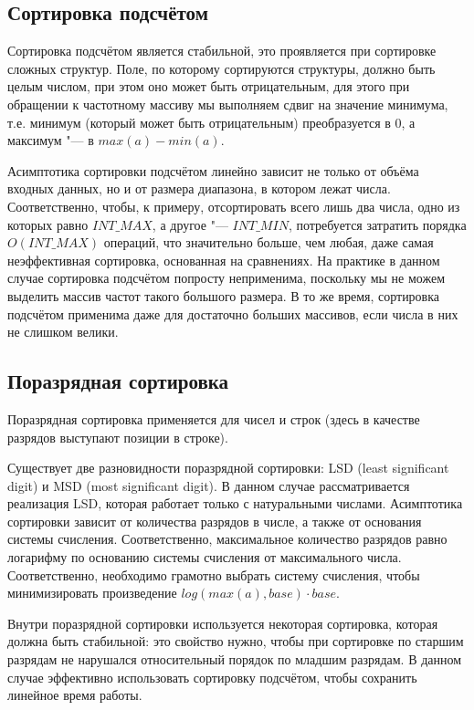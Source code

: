\documentclass[otchet]{../SCWorks}
\begin{document}
\subsection{Сортировка подсчётом}

Сортировка подсчётом является стабильной, это проявляется при сортировке сложных структур. Поле, по которому сортируются структуры, должно быть целым числом, при этом оно может быть отрицательным, для этого при обращении к частотному массиву мы выполняем сдвиг на значение минимума, т.е. минимум (который может быть отрицательным) преобразуется в $0$, а максимум "--- в $max(a) - min(a)$.

Асимптотика сортировки подсчётом линейно зависит не только от объёма входных данных, но и от размера диапазона, в котором лежат числа. Соответственно, чтобы, к примеру, отсортировать всего лишь два числа, одно из которых равно $INT\_MAX$, а другое "--- $INT\_MIN$, потребуется затратить порядка $O(INT\_MAX)$ операций, что значительно больше, чем любая, даже самая неэффективная сортировка, основанная на сравнениях. На практике в данном случае сортировка подсчётом попросту неприменима, поскольку мы не можем выделить массив частот такого большого размера. В то же время, сортировка подсчётом применима даже для достаточно больших массивов, если числа в них не слишком велики.

\subsection{Поразрядная сортировка}

Поразрядная сортировка применяется для чисел и строк (здесь в качестве разрядов выступают позиции в строке).

Существует две разновидности поразрядной сортировки: LSD (least significant digit) и MSD (most significant digit). В данном случае рассматривается реализация LSD, которая работает только с натуральными числами. Асимптотика сортировки зависит от количества разрядов в числе, а также от основания системы счисления. Соответственно, максимальное количество разрядов равно логарифму по основанию системы счисления от максимального числа. Соответственно, необходимо грамотно выбрать систему счисления, чтобы минимизировать произведение $log(max(a), base) \cdot base$.

Внутри поразрядной сортировки используется некоторая сортировка, которая должна быть стабильной: это свойство нужно, чтобы при сортировке по старшим разрядам не нарушался относительный порядок по младшим разрядам. В данном случае эффективно использовать сортировку подсчётом, чтобы сохранить линейное время работы.
\end{document}
